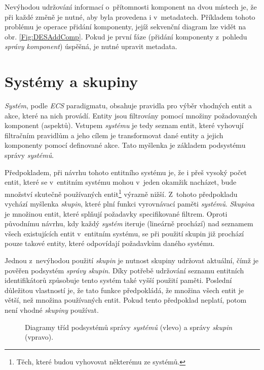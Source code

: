 Nevýhodou udržování informací o~přítomnosti komponent na dvou místech je, že při každé změně je nutné, aby byla provedena i v~metadatech. Příkladem tohoto problému je operace přidání komponenty, jejíž sekvenční diagram lze vidět na obr. \ref{Fig:DESAddComp}. Pokud je první fáze (přidání komponenty z~pohledu \emph{správy komponent}) úspěšná, je nutné upravit metadata.

\section{Systémy a skupiny}
\label{Chap:SysGroup}

\emph{Systém}, podle \emph{ECS} paradigmatu, obsahuje pravidla pro výběr vhodných entit a akce, které na nich provádí. Entity jsou filtrovány pomocí množiny požadovaných komponent (aspektů). Vstupem \emph{systému} je tedy seznam entit, které vyhovují filtračním pravidlům a jeho cílem je transformovat dané entity a jejich komponenty pomocí definované akce. Tato myšlenka je základem podsystému správy \emph{systémů}. 

Předpokladem, při návrhu tohoto entitního systému je, že i přeš vysoký počet entit, které se v~entitním systému mohou v~jeden okamžik nacházet, bude množství skutečně používaných entit\footnote{Těch, které budou vyhovovat některému ze systémů.} výrazně nižší. Z~tohoto předpokladu vychází myšlenka \emph{skupin}, které plní funkci vyrovnávací paměti \emph{systémů}. \emph{Skupina} je množinou entit, které splňují požadavky specifikované filtrem. Oproti původnímu návrhu, kdy každý \emph{systém} iteruje (lineárně prochází) nad seznamem všech existujících entit v~entitním systému, se při použití skupin již prochází pouze takové entity, které odpovídají požadavkům daného systému.

Jednou z~nevýhodou použití \emph{skupin} je nutnost skupiny udržovat aktuální, čímž je pověřen podsystém \emph{správy skupin}. Díky potřebě udržování seznamu entitních identifikátorů způsobuje tento systém také vyšší použití paměti. Poslední důležitou vlastností je, že tato funkce předpokládá, že množina všech entit je větší, než množina používaných entit. Pokud tento předpoklad neplatí, potom není vhodné \emph{skupiny} používat.

\begin{figure}[H]
	\centering
	\caption{Diagramy tříd podsystémů správy \emph{systémů} (vlevo) a správy \emph{skupin} (vpravo).}
	\label{Fig:DESSysGrpDiagram}
\end{figure}

